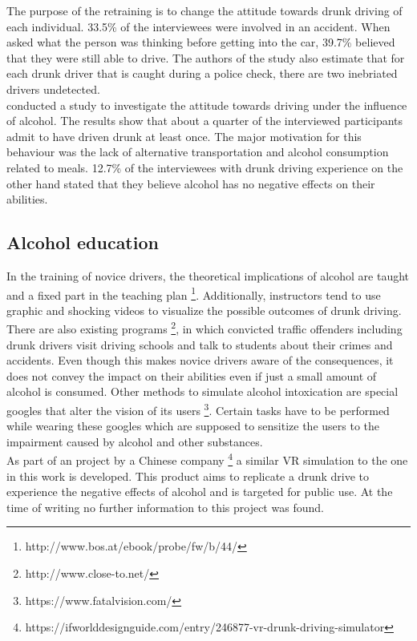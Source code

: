 The purpose of the retraining is to change the attitude towards drunk driving of each individual. 
33.5\% of the interviewees were involved in an accident. 
When asked what the person was thinking before getting into the car, 39.7\% believed that they were still able to drive.
The authors of the study also estimate that for each drunk driver that is caught during a police check, there are two inebriated drivers undetected.
\\
\textcite[1]{alonso2015driving} conducted a study to investigate the attitude towards driving under the influence of alcohol.
The results show that about a quarter of the interviewed participants admit to have driven drunk at least once.
The major motivation for this behaviour was the lack of alternative transportation and alcohol consumption related to meals. 
12.7\% of the interviewees with drunk driving experience on the other hand stated that they believe alcohol has no negative effects on their abilities.
%
\subsection{Alcohol education}
\label{subsection:alcoholEducation}
%

In the training of novice drivers, the theoretical implications of alcohol are taught and a fixed part in the teaching plan \footnote{http://www.bos.at/ebook/probe/fw/b/44/}.
Additionally, instructors tend to use graphic and shocking videos to visualize the possible outcomes of drunk driving.
There are also existing programs \footnote{http://www.close-to.net/}, in which convicted traffic offenders including drunk drivers visit driving schools and talk to students about their crimes and accidents.
Even though this makes novice drivers aware of the consequences, it does not convey the impact on their abilities even if just a small amount of alcohol is consumed.
Other methods to simulate alcohol intoxication are special googles that alter the vision of its users \footnote{https://www.fatalvision.com/}.
Certain tasks have to be performed while wearing these googles which are supposed to sensitize the users to the impairment caused by alcohol and other substances.
\\
As part of an project by a Chinese company \footnote{https://ifworlddesignguide.com/entry/246877-vr-drunk-driving-simulator} a similar VR simulation to the one in this work is developed.
This product aims to replicate a drunk drive to experience the negative effects of alcohol and is targeted for public use.
At the time of writing no further information to this project was found.


